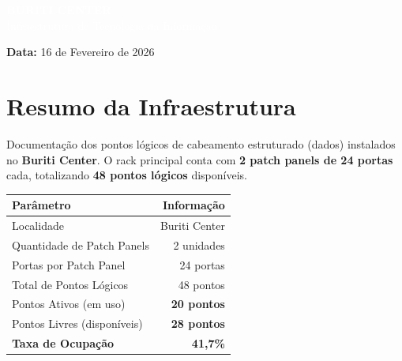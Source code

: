 \documentclass[12pt, a4paper]{article}
\begin{document}
\begin{titlepage}
    \vfill

    \colorbox{primaryColor}{%
        \parbox{0.9\textwidth}{%
            \centering
            \vspace{0.6cm}
            \textcolor{white}{\Large \textbf{BURITI CENTER}} \\
            \vspace{0.2cm}
            \textcolor{white}{\normalsize Infraestrutura de Tecnologia da Informação} \\
            \vspace{0.6cm}
        }%
    }

    \vspace{0.3cm}
    \textbf{Data:} 16 de Fevereiro de 2026
\end{titlepage}

\section{Resumo da Infraestrutura}

Documentação dos pontos lógicos de cabeamento estruturado (dados) instalados no \textbf{Buriti Center}. O rack principal conta com \textbf{2 patch panels de 24 portas} cada, totalizando \textbf{48 pontos lógicos} disponíveis.

\begin{table}[H]
    \centering
    \renewcommand{\arraystretch}{1.6}
    \Large
    \begin{tabularx}{\textwidth}{X r}
        \toprule
        \rowcolor{tableHeaderLight} \textbf{Parâmetro} & \textbf{Informação} \\
        \midrule
        Localidade & Buriti Center \\
        \rowcolor{lightGray}
        Quantidade de Patch Panels & 2 unidades \\
        Portas por Patch Panel & 24 portas \\
        \rowcolor{lightGray}
        Total de Pontos Lógicos & 48 pontos \\
        Pontos Ativos (em uso) & \textcolor{portActive}{\textbf{20 pontos}} \\
        \rowcolor{lightGray}
        Pontos Livres (disponíveis) & \textcolor{secondaryText}{\textbf{28 pontos}} \\
        \midrule
        \rowcolor{accentColor!10} \textbf{Taxa de Ocupação} & \textbf{41,7\%} \\
        \bottomrule
    \end{tabularx}
\end{table}
\end{document}

